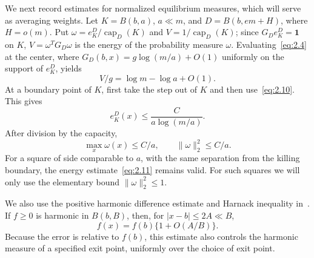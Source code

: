 \documentclass[11pt,letterpaper,reqno]{amsart}
\newif\ifrevmarks \revmarkstrue
\newcommand{\add}[1]{\ifrevmarks\textcolor{revorange}{#1}\else#1\fi}
\numberwithin{equation}{section}
\theoremstyle{remark}
\begin{document}
\add{We next record estimates for normalized equilibrium measures, which will serve as averaging weights.} Let $K=B(b,a)$, $a\ll m$, and $D=B(b,em+H)$, where $H=o(m)$. Put
$\omega=e_K^D/\operatorname{cap}_D(K)$ and $V=1/\operatorname{cap}_D(K)$\add{; since $G_De_K^D=\mathbf1$ on $K$, $V=\omega^TG_D\omega$ is the energy of the probability measure $\omega$}.
Evaluating~\eqref{eq:2.4} at the center, where $G_D(b,x)=g\log(m/a)+O(1)$ uniformly on the support of $e_K^D$, yields
\begin{equation}\label{eq:2.11}
V/g=\log m-\log a+O(1).
\end{equation}
At a boundary point of $K$, first take the step out of $K$ and then use~\eqref{eq:2.10}. This gives
\[
e_K^D(x)\le\frac{C}{a\log(m/a)}.
\]
After division by the capacity,
\begin{equation}\label{eq:2.12}
\max_x\omega(x)\le C/a,\qquad \|\omega\|_2^2\le C/a.
\end{equation}
For a square of side comparable to $a$, with the same separation from the killing boundary, the energy estimate~\eqref{eq:2.11} remains valid. For such squares we will only use the elementary bound $\|\omega\|_2^2\le1$.

We also use the positive harmonic difference estimate and Harnack inequality in~\cite[Theorems 6.3.8(b) and 6.3.9]{LL}. If $f\ge0$ is harmonic in $B(b,B)$, then, for $|x-b|\le2A\ll B$,
\begin{equation}\label{eq:2.13}
f(x)=f(b)\{1+O(A/B)\}.
\end{equation}
Because the error is relative to $f(b)$, this estimate also controls the harmonic measure of a specified exit point, uniformly over the choice of exit point.
\end{document}
